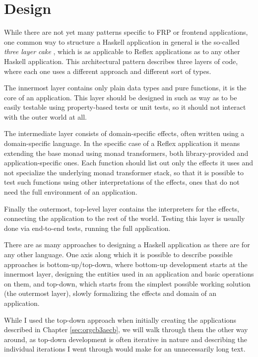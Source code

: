 \documentclass[english,odsaz]{fitthesis}
\begin{document}
\section{Design}
\label{sec:orgcd10802}
While there are not yet many patterns specific to FRP or frontend applications,
one common way to structure a Haskell application in general is the so-called
\emph{three layer cake} \cite{three-layer}, which is as applicable to Reflex applications as
to any other Haskell application. This architectural pattern describes three
layers of code, where each one uses a different approach and different sort of
types.

The innermost layer contains only plain data types and pure functions, it is the
core of an application. This layer should be designed in such as way as to be
easily testable using property-based tests or unit tests, so it should not
interact with the outer world at all.

The intermediate layer consists of domain-specific effects, often written using
a domain-specific language. In the specific case of a Reflex application it
means extending the base monad using monad transformers, both library-provided
and application-specific ones. Each function should list out only the effects it
uses and not specialize the underlying monad transformer stack, so that it is
possible to test such functions using other interpretations of the effects, ones
that do not need the full environment of an application.

Finally the outermost, top-level layer contains the interpreters for the
effects, connecting the application to the rest of the world. Testing this layer
is usually done via end-to-end tests, running the full application.

There are as many approaches to designing a Haskell application as there are for
any other language. One axis along which it is possible to describe possible
approaches is bottom-up/top-down, where bottom-up development starts at the
innermost layer, designing the entities used in an application and basic
operations on them, and top-down, which starts from the simplest possible
working solution (the outermost layer), slowly formalizing the effects and
domain of an application.

While I used the top-down approach when initially creating the applications
described in Chapter \ref{sec:orgcb3aecb}, we will walk through them the other way
around, as top-down development is often iterative in nature and describing the
individual iterations I went through would make for an unnecessarily long text.
\end{document}
